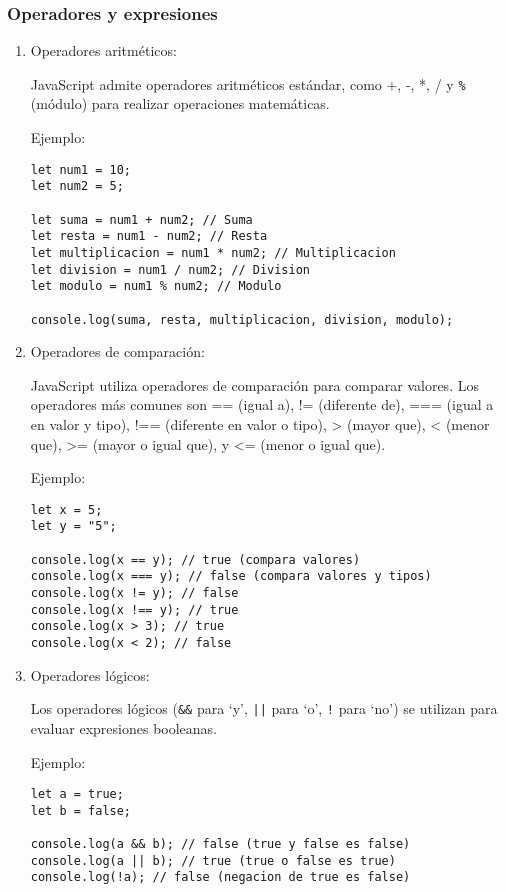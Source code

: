 \documentclass[executivepaper]{article}
\begin{document}
\subsubsection*{Operadores y expresiones}
\begin{enumerate}
  \item Operadores aritméticos:
  
  JavaScript admite operadores aritméticos estándar, como +, -, *, / y \lstinline{%} (módulo) para realizar operaciones matemáticas.

  Ejemplo:
\begin{lstlisting}
let num1 = 10;
let num2 = 5;

let suma = num1 + num2; // Suma
let resta = num1 - num2; // Resta
let multiplicacion = num1 * num2; // Multiplicacion
let division = num1 / num2; // Division
let modulo = num1 % num2; // Modulo

console.log(suma, resta, multiplicacion, division, modulo);
\end{lstlisting}

  \item Operadores de comparación:
  
  JavaScript utiliza operadores de comparación para comparar valores. Los operadores más comunes son == (igual a), != (diferente de), === (igual a en valor y tipo), !== (diferente en valor o tipo), > (mayor que), < (menor que), >= (mayor o igual que), y <= (menor o igual que).

  Ejemplo:
\begin{lstlisting}
let x = 5;
let y = "5";

console.log(x == y); // true (compara valores)
console.log(x === y); // false (compara valores y tipos)
console.log(x != y); // false
console.log(x !== y); // true
console.log(x > 3); // true
console.log(x < 2); // false
\end{lstlisting}
  
  \item Operadores lógicos:
  
  Los operadores lógicos (\lstinline{&&} para \enquote*{y}, \lstinline{||} para \enquote*{o}, \lstinline{!} para \enquote*{no}) se utilizan para evaluar expresiones booleanas.

  Ejemplo:
\begin{lstlisting}
let a = true;
let b = false;

console.log(a && b); // false (true y false es false)
console.log(a || b); // true (true o false es true)
console.log(!a); // false (negacion de true es false)
\end{lstlisting}
\end{enumerate}
\end{document}
